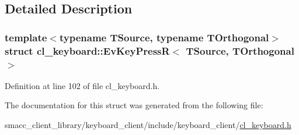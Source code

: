 \subsection{Detailed Description}
\subsubsection*{template$<$typename T\+Source, typename T\+Orthogonal$>$\newline
struct cl\+\_\+keyboard\+::\+Ev\+Key\+Press\+R$<$ T\+Source, T\+Orthogonal $>$}



Definition at line 102 of file cl\+\_\+keyboard.\+h.



The documentation for this struct was generated from the following file\+:\begin{DoxyCompactItemize}
\item 
smacc\+\_\+client\+\_\+library/keyboard\+\_\+client/include/keyboard\+\_\+client/\hyperlink{cl__keyboard_8h}{cl\+\_\+keyboard.\+h}\end{DoxyCompactItemize}
